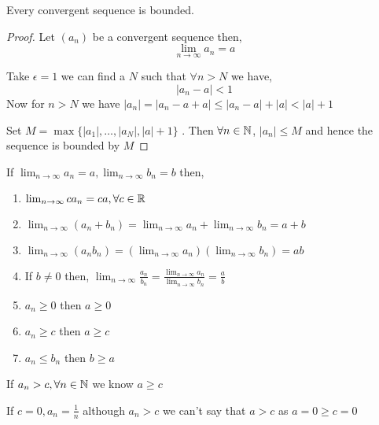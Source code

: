 \begin{theorem}
    Every convergent sequence is bounded.
\end{theorem}
\begin{proof}
    Let $(a_n)$ be a convergent sequence then, 
    $$ \lim_{n \to \infty} a_n  = a $$ 

    Take $\epsilon = 1$ we can find a $N$ such that $\forall n > N$ we have,  
    $$ |a_n - a| < 1 $$ 
    Now for $n > N$ we have  $|a_n| = |a_n - a + a | \le |a_n -a | + |a| < |a| + 1$

    \vspace{1em}

    Set $M = \max \{|a_1|, \dots, |a_N|, |a|+ 1\} $ . Then $\forall n \in \mathbb{N}$,  $|a_n|\le M$ and hence the sequence is bounded by  $M$

\end{proof}

\begin{theorem}
    
    If $  \lim_{n \to \infty} a_n = a, \lim_{n \to \infty} b_n  = b$  then, 

    \begin{enumerate}
        \item $\lim_{n \to \infty} ca_n = ca, \forall c \in \mathbb{R}$
        \item $\lim_{n \to \infty} (a_n + b_n) = \lim_{n \to \infty} a_n + \lim_{n \to \infty} b_n = a + b$
        \item $\lim_{n \to \infty} (a_n b_n) = (\lim_{n \to \infty} a_n)(\lim_{n \to \infty} b_n) = ab$
        \item If $b \ne 0$ then, $\lim_{n \to \infty}\frac{a_n}{b_n} = \frac{\lim_{n \to \infty} a_n}{\lim_{n \to \infty} b_n} = \frac{a}{b}$ 
        \item $a_n \ge 0$ then  $a \ge 0$
        \item  $a_n \ge c$ then  $a \ge c$
        \item  $a_n \le b_n$ then  $b \ge a$
    \end{enumerate}
\end{theorem}
\begin{remark}
    If $a_n > c, \forall n \in \mathbb{N}$ we know  $a \ge c$
\end{remark}
\begin{eg}
    If $c = 0, a_n = \frac{1}{n}$ although $a_n > c$ we can't say that  $a > c$ as  $a = 0 \ge c = 0$
\end{eg}

